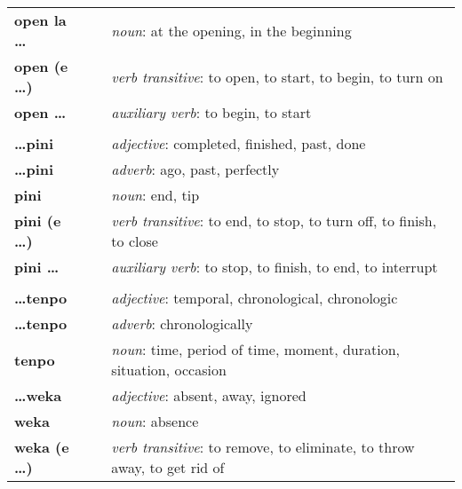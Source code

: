 \begin{supertabular}{p{2,5cm}|ll}
    \textbf{open la \dots}   &  & \textit{noun}: at the opening, in the beginning                                  \\
    \textbf{open (e \dots)}  &  & \textit{verb transitive}: to open, to start, to begin, to turn on                \\
    \textbf{open \dots }     &  & \textit{auxiliary verb}: to begin, to start                                      \\
                             &  &                                                                                  \\
    \textbf{\dots pini}      &  & \textit{adjective}: completed, finished, past, done                              \\
    \textbf{\dots pini}      &  & \textit{adverb}: ago, past, perfectly                                            \\
    \textbf{pini}            &  & \textit{noun}: end, tip                                                          \\
    \textbf{pini (e \dots)}  &  & \textit{verb transitive}: to end, to stop, to turn off, to finish, to close      \\
    \textbf{pini \dots }     &  & \textit{auxiliary verb}: to stop, to finish, to end, to interrupt                \\
                             &  &                                                                                  \\
    \textbf{\dots tenpo}     &  & \textit{adjective}: temporal, chronological, chronologic                         \\
    \textbf{\dots tenpo}     &  & \textit{adverb}: chronologically                                                 \\
    \textbf{tenpo}           &  & \textit{noun}: time, period of time, moment, duration, situation, occasion       \\
    \textbf{\dots weka}      &  & \textit{adjective}: absent, away, ignored                                        \\
    \textbf{weka}            &  & \textit{noun}: absence                                                           \\
    \textbf{weka (e \dots)}  &  & \textit{verb transitive}: to remove, to eliminate, to throw away, to get rid of  \\
\end{supertabular}

